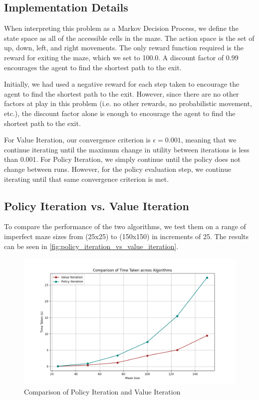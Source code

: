 \documentclass{article}
\begin{document}
\subsection{Implementation Details}
When interpreting this problem as a Markov Decision Process, we define the state space as all of the accessible cells in the maze. The action space is the set of up, down, left, and right movements. The only reward function required is the reward for exiting the maze, which we set to 100.0. A discount factor of 0.99 encourages the agent to find the shortest path to the exit.

Initially, we had used a negative reward for each step taken to encourage the agent to find the shortest path to the exit. However, since there are no other factors at play in this problem (i.e. no other rewards, no probabilistic movement, etc.), the discount factor alone is enough to encourage the agent to find the shortest path to the exit.

For Value Iteration, our convergence criterion is $\epsilon = 0.001$, meaning that we continue iterating until the maximum change in utility between iterations is less than 0.001.
For Policy Iteration, we simply continue until the policy does not change between runs. However, for the policy evaluation step, we continue iterating until that same convergence criterion is met.
\subsection{Policy Iteration vs. Value Iteration}

To compare the performance of the two algorithms, we test them on a range of imperfect maze sizes from (25x25) to (150x150) in increments of 25. The results can be seen in \autoref{fig:policy_iteration_vs_value_iteration}.

\begin{figure}[h]
    \centering
    \includegraphics[width=\textwidth]{Value iteration vs. policy time .png}
    \caption{Comparison of Policy Iteration and Value Iteration}
    \label{fig:policy_iteration_vs_value_iteration}
\end{figure}
\end{document}
